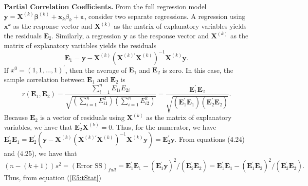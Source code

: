 \textbf{Partial Correlation Coefficients.} From the full regression
model $ \mathbf{y}=\mathbf{X}^{(k)}\boldsymbol
\beta^{(k)}+\mathbf{x}_{k}\beta_{k}+\boldsymbol \varepsilon$,
consider two separate regressions. A regression using
$\mathbf{x}^{k}$ as the response vector and $\mathbf{X}^{(k)}$ as
the matrix of explanatory variables yields the residuals
$\mathbf{E}_2$. Similarly, a regression $\mathbf{y}$ as the response
vector and $\mathbf{X}^{(k)}$ as the matrix of explanatory variables
yields the residuals
\begin{equation*}
\mathbf{E}_1 = \mathbf{y} - \mathbf{X}^{(k)} \left(
\mathbf{X}^{(k)\prime} \mathbf{X}^{(k)}\right)^{-1} \mathbf{X}^{(k)}
\mathbf{y.}
\end{equation*}
If $x^{0}=(1,1,\ldots,1)^{\prime}$, then the average of $
\mathbf{E}_1$ and $\mathbf{E}_2$ is zero. In this case, the sample
correlation between $\mathbf{E}_1$ and $\mathbf{E}_2$ is
\begin{equation*}
r(\mathbf{E}_1,\mathbf{E}_2) = \frac{\sum_{i=1}^{n} E_{1i}
E_{2i}}{\sqrt{\left( \sum_{i=1}^{n} E_{i1}^2\right) \left(
\sum_{i=1}^{n} E_{i2}^2\right) }} = \frac{\mathbf{E}_1^{\prime}
\mathbf{E}_2}{\sqrt{\left( \mathbf{E}_1^{\prime}\mathbf{E}_1\right)
\left( \mathbf{E}_2^{\prime}\mathbf{E}_2 \right) }}.
\end{equation*}
Because $\mathbf{E}_2$ is a vector of residuals using $\mathbf{X}
^{(k)}$ as the matrix of explanatory variables, we have that
$\mathbf{E}_2^{\prime} \mathbf{X}^{(k)} = 0$. Thus, for the
numerator, we have
\newline $\mathbf{E}_2^{\prime}\mathbf{E}_1 =
\mathbf{E}_2^{\prime}\left( \mathbf{y}-\mathbf{X}^{(k)}\left(
\mathbf{X}^{(k)\prime }\mathbf{X}^{(k)}\right)
^{-1}\mathbf{X}^{(k)}\mathbf{y}\right)
=\mathbf{E}_2^{\prime}\mathbf{y.}$ From equations (4.24) and (4.25),
we have that
\begin{equation*}
(n-(k+1))s^2 = (\text{Error SS})_{full} = \mathbf{E}_1^{\prime}
\mathbf{E}_1 - \left( \mathbf{E}_1^{\prime}\mathbf{y}\right) ^2 /
\left( \mathbf{E}_2^{\prime}\mathbf{E}_2\right) =
\mathbf{E}_1^{\prime}\mathbf{E}_1 - \left( \mathbf{E}
_1^{\prime}\mathbf{E}_2\right) ^2/\left(
\mathbf{E}_2^{\prime}\mathbf{E}_2\right).
\end{equation*}
Thus, from equation (\ref{E5:tStat})
